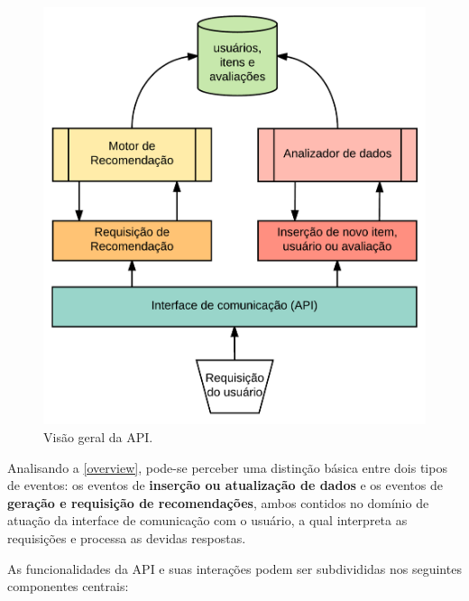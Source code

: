 \documentclass[12pt, openright, oneside, a4paper, brazil]{abntex2}
\begin{document}
\begin{figure}[htp]

	\caption{\label{overview}Visão geral da API.}

	\begin{center}
		\includegraphics[scale=0.6]{images/MORPY_overview.png}
	\end{center}

	\hspace{5.5cm}{Fonte: O Autor.}

\end{figure}

Analisando a \autoref{overview}, pode-se perceber uma distinção básica entre dois tipos de eventos: os eventos de \textbf{inserção ou atualização de dados} e os eventos de \textbf{geração e requisição de recomendações}, ambos contidos no domínio de atuação da interface de comunicação com o usuário, a qual interpreta as requisições e processa as devidas respostas.

As funcionalidades da API e suas interações podem ser subdivididas nos seguintes componentes centrais:
\end{document}
